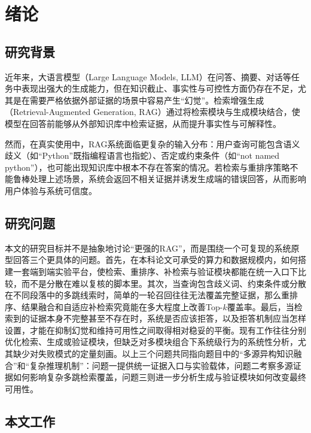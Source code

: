 \cleardoublepage

\section{绪论}

\subsection{研究背景}

近年来，大语言模型（Large Language Models, LLM）在问答、摘要、对话等任务中表现出强大的生成能力，但在知识截止、事实性与可控性方面仍存在不足，尤其是在需要严格依据外部证据的场景中容易产生“幻觉”\cite{gpt3, gpt4}。检索增强生成（Retrieval-Augmented Generation, RAG）通过将检索模块与生成模块结合，使模型在回答前能够从外部知识库中检索证据，从而提升事实性与可解释性\cite{ref1}。

然而，在真实使用中，RAG系统面临更复杂的输入分布：用户查询可能包含语义歧义（如“Python”既指编程语言也指蛇）、否定或约束条件（如“not named python”），也可能出现知识库中根本不存在答案的情况。若检索与重排序策略不能鲁棒处理上述场景，系统会返回不相关证据并诱发生成端的错误回答，从而影响用户体验与系统可信度\cite{ref26}。

\subsection{研究问题}

本文的研究目标并不是抽象地讨论“更强的RAG”，而是围绕一个可复现的系统原型回答三个更具体的问题。首先，在本科论文可承受的算力和数据规模内，如何搭建一套端到端实验平台，使检索、重排序、补检索与验证模块都能在统一入口下比较，而不是分散在难以复核的脚本里。其次，当查询包含歧义词、约束条件或分散在不同段落中的多跳线索时，简单的一轮召回往往无法覆盖完整证据，那么重排序、结果融合和自适应补检索究竟能在多大程度上改善Top-$k$覆盖率。最后，当检索到的证据本身不完整甚至不存在时，系统是否应该拒答，以及拒答机制应当怎样设置，才能在抑制幻觉和维持可用性之间取得相对稳妥的平衡。现有工作往往分别优化检索、生成或验证模块，但缺乏对多模块组合下系统级行为的系统性分析，尤其缺少对失败模式的定量刻画。以上三个问题共同指向题目中的“多源异构知识融合”和“复杂推理机制”：问题一提供统一证据入口与实验载体，问题二考察多源证据如何影响复杂多跳检索覆盖，问题三则进一步分析生成与验证模块如何改变最终可用性。

\subsection{本文工作}

